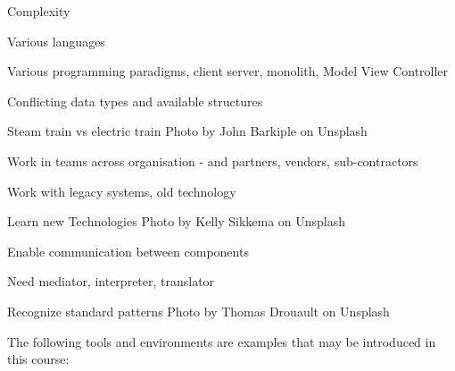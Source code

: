 \documentclass[Screen16to9,17pt]{foils}
\begin{document}


\begin{list2}
\item Complexity
\item Various languages
\item Various programming paradigms, client server, monolith, Model View Controller
\item Conflicting data types and available structures
\item Steam train vs electric train \hfill Photo by John Barkiple on Unsplash

\end{list2}






\begin{list2}
\item Work in teams across organisation - and partners, vendors, sub-contractors
\item Work with legacy systems, old technology
\item Learn new Technologies \hfill Photo by Kelly Sikkema on Unsplash
\end{list2}






\begin{list2}
\item Enable communication between components
\item Need mediator, interpreter, translator
\item Recognize standard patterns \hfill Photo by Thomas Drouault on Unsplash
\end{list2}





The following tools and environments are examples that may be introduced in this course:
\end{document}
